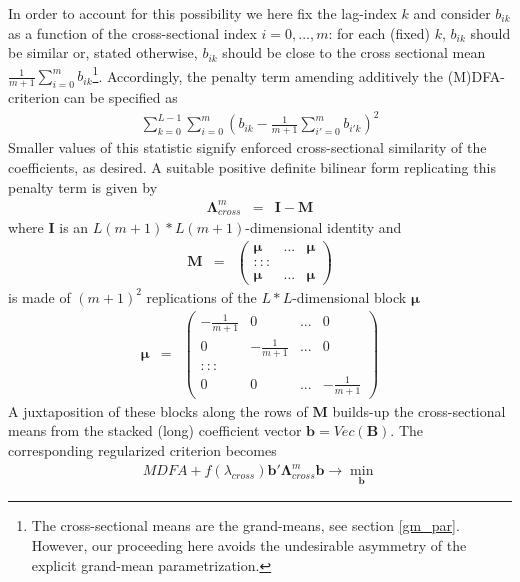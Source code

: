 \documentclass[a4paper]{book}
\begin{document}
In order to account for this possibility we here fix the lag-index $k$ and consider $b_{ik}$ as a function of the cross-sectional index $i=0,...,m$: for each (fixed) $k$, $b_{ik}$ should be similar or, stated otherwise, $b_{ik}$ should be close to the cross sectional mean $\frac{1}{m+1}\sum_{i=0}^mb_{ik}$\footnote{The cross-sectional means are the grand-means, see section \ref{gm_par}. However, our proceeding here avoids the undesirable asymmetry of the explicit grand-mean parametrization.}. Accordingly,  the penalty term amending additively the (M)DFA-criterion can be specified as
\begin{eqnarray}\label{centm}
\sum_{k=0}^{L-1}\sum_{i=0}^m\left(b_{ik}-\frac{1}{m+1}\sum_{i'=0}^mb_{i'k}\right)^2
\end{eqnarray}
Smaller values of this statistic signify enforced cross-sectional similarity of the coefficients, as desired. A suitable positive definite bilinear form replicating this penalty term is given by 
\begin{eqnarray}\label{sympa}
\boldsymbol{\Lambda}_{cross}^m&=&\mathbf{I}-\boldsymbol{M}
\end{eqnarray}
where $\mathbf{I}$ is an $L(m+1)*L(m+1)$-dimensional identity and
\begin{eqnarray*}
\boldsymbol{M}&=&\left(\begin{array}{ccc}\boldsymbol{\mu}&...&\boldsymbol{\mu}\\
:::\\
\boldsymbol{\mu}&...&\boldsymbol{\mu}\end{array}\right)
\end{eqnarray*}
is made of $(m+1)^2$ replications of the $L*L$-dimensional block $\boldsymbol{\mu}$
\begin{eqnarray*}
\boldsymbol{\mu}&=&\left(\begin{array}{cccc}
-\frac{1}{m+1}&0&...&0\\
0&-\frac{1}{m+1}&...&0\\
:::\\
0&0&...&-\frac{1}{m+1}
\end{array}\right)
\end{eqnarray*}
A juxtaposition of these blocks along the rows of $\boldsymbol{M}$ builds-up the cross-sectional means from the stacked (long) coefficient vector $\mathbf{b}=Vec(\mathbf{B})$. The corresponding regularized criterion becomes
\begin{eqnarray}\label{smooth_term}
MDFA+f(\lambda_{cross})\mathbf{b}'\boldsymbol{\Lambda}_{cross}^m\mathbf{b}\to \min_{\mathbf{b}}
\end{eqnarray}
\end{document}
